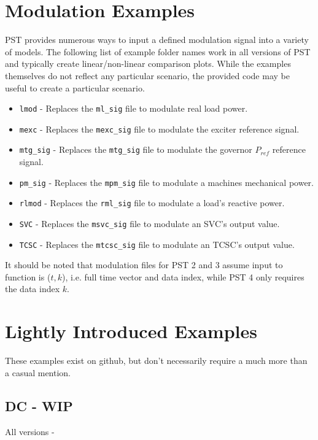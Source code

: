 \section{Modulation Examples} \label{sec: modExamples}
PST provides numerous ways to input a defined modulation signal into a variety of models.
The following list of example folder names work in all versions of PST and typically create linear/non-linear comparison plots.
While the examples themselves do not reflect any particular scenario, the provided code may be useful to create a particular scenario.

\begin{itemize}
\item \verb|lmod| - Replaces the \verb|ml_sig| file to modulate real load power.
\item \verb|mexc| - Replaces the \verb|mexc_sig| file to modulate the exciter reference signal.
\item \verb|mtg_sig| - Replaces the \verb|mtg_sig| file to modulate the governor $P_{ref}$ reference signal.
\item \verb|pm_sig| - Replaces the \verb|mpm_sig| file to modulate a machines mechanical power.
\item \verb|rlmod| - Replaces the \verb|rml_sig| file to modulate a load's reactive power.
\item \verb|SVC| - Replaces the \verb|msvc_sig| file to modulate an SVC's output value.
\item \verb|TCSC| - Replaces the \verb|mtcsc_sig| file to modulate an TCSC's output value.
\end{itemize}

\noindent It should be noted that modulation files for PST 2 and 3 assume input to function is ($t, k$), i.e. full time vector and data index, while PST 4 only requires the data index $k$.

\pagebreak
\section{Lightly Introduced Examples}
These examples exist on github, but don't necessarily require a much more than a casual mention.
\subsection{DC - WIP}
All versions - 

